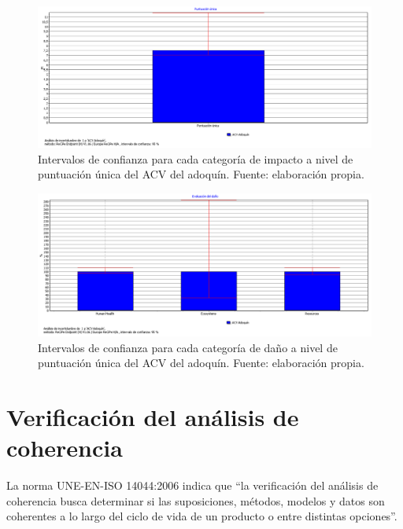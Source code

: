 \begin{figure}[!htb]
\centering
\includegraphics[width=15cm]{img/confianza_puntuacionunica.png}
\caption[Intervalos de confianza para cada categoría de impacto a nivel de puntuación única del ACV del adoquín.]{Intervalos de confianza para cada categoría de impacto a nivel de puntuación única del ACV del adoquín. Fuente: elaboración propia.}
\label{fig:confianza_puntuacionunica}
\end{figure}

\begin{figure}[!htb]
\centering
\includegraphics[width=15cm]{img/confianza_dano.png}
\caption[Intervalos de confianza para cada categoría de daño a nivel de puntuación única del ACV del adoquín.]{Intervalos de confianza para cada categoría de daño a nivel de puntuación única del ACV del adoquín. Fuente: elaboración propia.}
\label{fig:confianza_dano}
\end{figure}


\section{Verificación del análisis de coherencia}

La norma UNE-EN-ISO 14044:2006 indica que ``la verificación del análisis de coherencia busca determinar si las suposiciones, métodos, modelos y datos son coherentes a lo largo del ciclo de vida de un producto o entre distintas opciones''.

